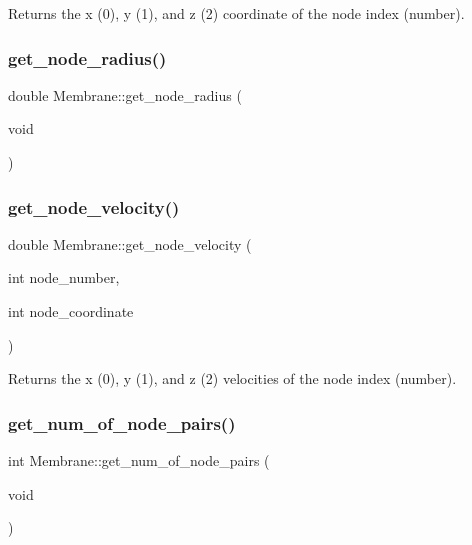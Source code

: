 Returns the x (0), y (1), and z (2) coordinate of the node index (number). \mbox{\label{classMembrane_a55c6aba6d26420c0796841125e2a6b98}} 
\subsubsection{\texorpdfstring{get\_node\_radius()}{get\_node\_radius()}}
{\footnotesize\ttfamily double Membrane\+::get\+\_\+node\+\_\+radius (\begin{DoxyParamCaption}\item[{void}]{ }\end{DoxyParamCaption})\hspace{0.3cm}{\ttfamily [inline]}}

\mbox{\label{classMembrane_aa98408c0a273e6e2219618d98f7cb800}} 
\subsubsection{\texorpdfstring{get\_node\_velocity()}{get\_node\_velocity()}}
{\footnotesize\ttfamily double Membrane\+::get\+\_\+node\+\_\+velocity (\begin{DoxyParamCaption}\item[{int}]{node\+\_\+number,  }\item[{int}]{node\+\_\+coordinate }\end{DoxyParamCaption})\hspace{0.3cm}{\ttfamily [inline]}}

Returns the x (0), y (1), and z (2) velocities of the node index (number). \mbox{\label{classMembrane_a8dba8af8f79eeb588edfea309e530368}} 
\subsubsection{\texorpdfstring{get\_num\_of\_node\_pairs()}{get\_num\_of\_node\_pairs()}}
{\footnotesize\ttfamily int Membrane\+::get\+\_\+num\+\_\+of\+\_\+node\+\_\+pairs (\begin{DoxyParamCaption}\item[{void}]{ }\end{DoxyParamCaption})\hspace{0.3cm}{\ttfamily [inline]}}

